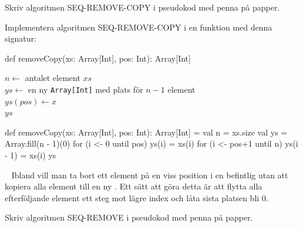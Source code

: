 {\Subtask\Pen Skriv algoritmen SEQ-REMOVE-COPY i pseudokod med penna på papper.

\Subtask Implementera algoritmen SEQ-REMOVE-COPY i en funktion med denna signatur:
\begin{Code}
def removeCopy(xs: Array[Int], pos: Int): Array[Int]
\end{Code}

\SOLUTION


\TaskSolved \what


\SubtaskSolved

\begin{algorithm}[H]

 $n \leftarrow$ antalet element $xs$\\
 $ys \leftarrow$ en ny \texttt{Array[Int]} med plats för $n-1$ element \\
 $ys(pos) \leftarrow x$ \\
 \Return $ys$
\end{algorithm}

\SubtaskSolved  \begin{Code}
def removeCopy(xs: Array[Int], pos: Int): Array[Int] = {
  val n = xs.size
  val ys = Array.fill(n - 1)(0)
  for (i <- 0 until pos) ys(i) = xs(i)
  for (i <- pos+1 until n) ys(i - 1) = xs(i)
  ys
}
\end{Code}



\QUESTEND









\QUESTBEGIN

\Task  \what~  Ibland vill man ta bort ett element på en viss position i en befintlig  utan att kopiera alla element till en ny . Ett sätt att göra detta är att flytta alla efterföljande element ett steg mot lägre index och låta sista platsen bli 0.

\Subtask\Pen Skriv algoritmen SEQ-REMOVE i pseudokod med penna på papper.

}
